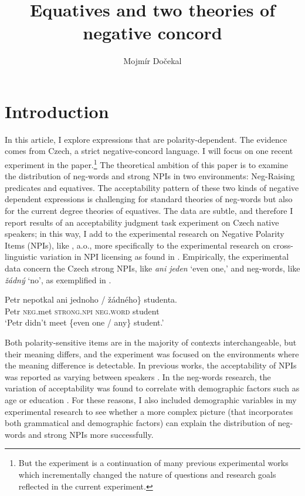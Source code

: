 \documentclass[output=paper,colorlinks,citecolor=brown]{langscibook}
\author{Mojmír Dočekal\orcid{0000-0002-9993-4756}\affiliation{Masaryk University} }
\title{Equatives and two theories of negative concord}
\begin{document}
\maketitle

\section{Introduction}\label{doc:intro}

In this article, I explore expressions that are polarity-dependent. The evidence comes from Czech, a strict negative-concord language. I will focus on one recent experiment in the paper.\footnote{But the experiment is a continuation of many previous experimental works which incrementally changed the nature of questions and research goals reflected in the current experiment.} The theoretical ambition of this paper is to examine the distribution of neg-words and strong NPIs in two environments: Neg-Raising predicates and equatives. The acceptability pattern of these two kinds of negative dependent expressions is challenging for standard theories of neg-words but also for the current degree theories of equatives. The data are subtle, and therefore I report results of an acceptability judgment task experiment on Czech native speakers; in this way, I add to the experimental research on Negative Polarity Items (NPIs), like \citet{Chemla-Homer-Rothschild-NPI,gajewski2016another,alexandropoulou2020there}, a.o., more specifically to the experimental research on cross-linguistic variation in NPI licensing as found in \citet{djarv2018cognitive,schwarz2020italian,chierchia2019factivity}. Empirically, the experimental data concern the Czech strong NPIs, like \emph{ani jeden} `even one,' and neg-words, like \textit{žádný} `no', as exemplified in . 

\ea\label{ex-1}\gll Petr nepotkal \minsp{\{} {ani jednoho} / žádného\} studenta.\\
Petr \textsc{neg}.met {} \textsc{strong.npi} {} \textsc{neg.word} student\\
\glt `Petr didn't meet \{even one / any\} student.'
\z

\noindent Both polarity-sensitive items are in the majority of contexts interchangeable, but their meaning differs, and the experiment was focused on the environments where the meaning difference is detectable. In previous works, the acceptability of NPIs was reported as varying between speakers \citep{homer2021domains,sprouse2019}. In the neg-words research, the variation of acceptability was found to correlate with demographic factors such as age or education \citep{burnett2015variable,burnett2018structural}. For these reasons, I also included demographic variables in my experimental research to see whether a more complex picture (that incorporates both grammatical and demographic factors) can explain the distribution of neg-words and strong NPIs more successfully.  
\end{document}

